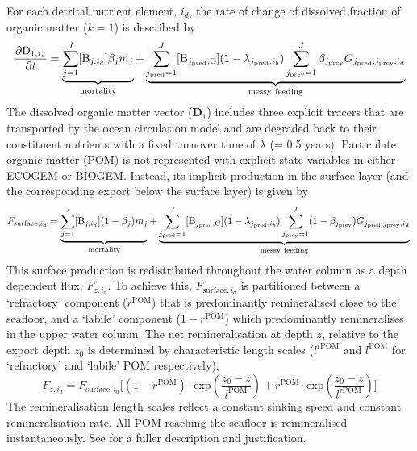 \documentclass[gmd, manuscript]{copernicus}
\begin{document}
{For each detrital nutrient element, $i_d$, the rate of change of dissolved fraction of organic matter ($k=1$) is described by
%
\begin{equation}
\frac{\partial {\rm D}_{1,i_d}}{\partial t} = \underbrace{ \sum_{j=1}^{J} [{\rm B}_{j,i_d}] \beta_{j} m_j }_{\rm mortality} 
 + \underbrace{ \sum_{j_{\rm pred}=1}^{J} [{\rm B}_{j_{\rm pred},{\rm C}}] (1-\lambda_{j_{\rm pred},i_b}) \sum_{j_{\rm prey}=1}^{J} \beta_{j_{\rm prey}} G_{j_{\rm pred},j_{\rm prey},i_d}}_{\rm messy~feeding} \label{dDdt}
\end{equation}
%
The dissolved organic matter vector (${\mathbf D}_{1}$) includes three explicit tracers that are transported by the ocean circulation model and are degraded back to their constituent nutrients with a fixed turnover time of $\lambda$ (= 0.5 years). Particulate organic matter (POM) is not represented with explicit state variables in either ECOGEM or BIOGEM. Instead, its implicit production in the surface layer (and the corresponding export below the surface layer) is given by 
%
\begin{equation} 
F_{\text{surface},i_d} = \underbrace{ \sum_{j=1}^{J} [{\rm B}_{j,i_d}] (1-\beta_{j}) m_j}_{\rm mortality} + \underbrace{ \sum_{j_{\rm pred}=1}^{J} [{\rm B}_{j_{\rm pred},{\rm C}}] (1-\lambda_{j_{\rm pred},i_b}) \sum_{j_{\rm prey}=1}^{J} (1-\beta_{j_{\rm prey}}) G_{j_{\rm pred},j_{\rm prey},i_d}}_{\rm messy~feeding} \nonumber\\ 
\end{equation}
% 
This surface production is redistributed throughout the water column as a depth dependent flux, $F_{z,i_d}$. To achieve this, $F_{\text{surface},i_d}$ is partitioned between a `refractory' component ($r^{\text{POM}}$) that is predominantly remineralised close to the seafloor, and a `labile' component ($1-r^{\text{POM}}$) which predominantly remineralises in the upper water column. The net remineralisation at depth $z$, relative to the export depth $z_{0}$ is determined by characteristic length scales (${l^{\text{rPOM}}}$ and ${l^{\text{POM}}}$ for `refractory' and `labile' POM respectively):
%
\begin{equation} \label{POM_remin}
F_{z,i_d} = F_{\text{surface},i_d} \Big[ (1-r^{\text{POM}}) \cdot \text{exp}(\frac{z_{0} - z} {l^{\text{POM}}}) + r^{\text{POM}} \cdot \text{exp}(\frac{z_{0} - z} {l^{\text{rPOM}}}) \Big]
\end{equation}
%
The remineralisation length scales reflect a constant sinking speed and constant remineralisation rate. All POM reaching the seafloor is remineralised instantaneously. See \citet{Ridgwell:2007} for a fuller description and justification.

}
\end{document}

